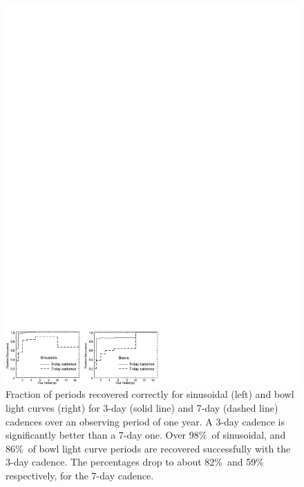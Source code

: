 \begin{figure}[b]
\vspace*{1.0 cm}
\begin{center}
 \includegraphics[width=5.32in]{figs/starFormation/tts2.pdf}
 \caption{ Fraction of periods recovered correctly for sinusoidal (left) and bowl light curves (right) for
3-day (solid line) and 7-day (dashed line) cadences over an observing period of one year.
A 3-day cadence is significantly better than a 7-day one. Over 98\%\ of sinusoidal, and 86\%\ of bowl
light curve periods are recovered successfully with the 3-day cadence. The percentages drop to about
82\%\ and 59\%\, respectively, for the 7-day cadence.
}
   \label{tts2}
\end{center}
\end{figure}


